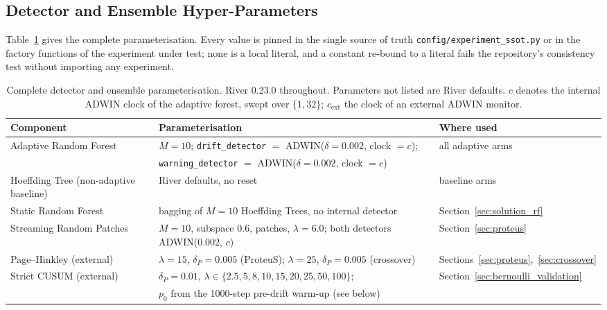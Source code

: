 \subsection{Detector and Ensemble Hyper-Parameters}\label{sec:protocol_hyper}

Table~\ref{tab:protocol_hyper} gives the complete parameterisation. Every value is pinned in the
single source of truth \texttt{config/experiment\_ssot.py} or in the factory functions of the
experiment under test; none is a local literal, and a constant re-bound to a literal fails the
repository's consistency test without importing any experiment.

\begin{table}[t]
  \centering
  \caption{Complete detector and ensemble parameterisation. River 0.23.0 throughout. Parameters not
  listed are River defaults. $c$ denotes the internal ADWIN clock of the adaptive forest, swept over
  $\{1, 32\}$; $c_{\mathrm{ext}}$ the clock of an external ADWIN monitor.}
  \label{tab:protocol_hyper}
  \small
  \begin{tabular}{@{}p{}p{}p{}@{}}
    \toprule
    \textbf{Component} & \textbf{Parameterisation} & \textbf{Where used} \\
    \midrule
    Adaptive Random Forest & $M = 10$; \texttt{drift\_detector} $=$ ADWIN($\delta = 0.002$, clock $= c$); & all adaptive arms \\
                           & \texttt{warning\_detector} $=$ ADWIN($\delta = 0.002$, clock $= c$) & \\
    Hoeffding Tree (non-adaptive baseline) & River defaults, no reset & baseline arms \\
    Static Random Forest & bagging of $M = 10$ Hoeffding Trees, no internal detector & Section~\ref{sec:solution_rf} \\
    Streaming Random Patches & $M = 10$, subspace $0.6$, patches, $\lambda = 6.0$; both detectors ADWIN($0.002$, $c$) & Section~\ref{sec:proteus} \\
    \midrule
    Page--Hinkley (external) & $\lambda = 15$, $\delta_P = 0.005$ (ProteuS); $\lambda = 25$, $\delta_P = 0.005$ (crossover) & Sections~\ref{sec:proteus},~\ref{sec:crossover} \\
    Strict CUSUM (external) & $\delta_P = 0.01$, $\lambda \in \{2.5, 5, 8, 10, 15, 20, 25, 50, 100\}$; & Section~\ref{sec:bernoulli_validation} \\
                            & $p_0$ from the 1000-step pre-drift warm-up (see below) & \\

\end{tabular}
\end{table}
